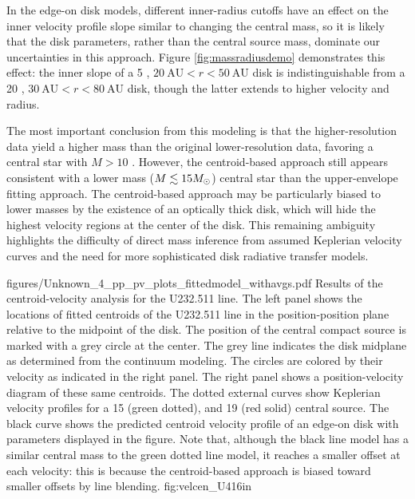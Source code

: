 \documentclass[twocolumn]{aastex61}
\begin{document}


In the edge-on disk models, different inner-radius cutoffs have an effect on
the inner velocity profile slope similar to changing the central mass, so it is
likely that the disk parameters, rather than the central source mass, dominate
our uncertainties in this approach.  
Figure \ref{fig:massradiusdemo} demonstrates this effect: the inner slope of
a 5 \msun, $20~\mathrm{AU} < r < 50~\mathrm{AU}$ disk is indistinguishable
from a 20 \msun , $30~\mathrm{AU} < r < 80~\mathrm{AU}$ disk, though the latter
extends to higher velocity and radius.

The most important conclusion from this modeling is that the higher-resolution
data yield a higher mass than the original lower-resolution data, favoring
a central star with $M>10$ \msun.  However, the centroid-based approach
still appears consistent with a lower mass ($M\lesssim15M_{\odot}$) central star
than the \citet{Seifried2016a} upper-envelope fitting approach.
The centroid-based approach may be particularly biased to lower masses
by the existence of an optically thick disk, which will hide the highest
velocity regions at the center of the disk.
This remaining
ambiguity highlights the difficulty of direct mass inference from assumed
Keplerian velocity curves and the need for more sophisticated disk radiative
transfer models.

\Figure
{figures/Unknown_4_pp_pv_plots_fittedmodel_withavgs.pdf}
{Results of the centroid-velocity analysis for the U232.511 line.
The left panel shows the locations of fitted centroids of the U232.511 line in
the position-position plane relative to the midpoint of the disk.  
The position of the central compact source is
marked with a grey circle at the center.  The grey line indicates the disk
midplane as determined from the continuum modeling.  The circles are colored by
their velocity as indicated in
the right panel.  The right panel shows a position-velocity diagram of these
same centroids.  The dotted external curves show Keplerian velocity profiles
for a 15 \msun (green dotted), and 19 \msun (red solid) central source.
The black
curve shows the predicted centroid velocity profile of an edge-on disk with
parameters displayed in the figure.
Note that, although the black line model has a similar central mass to the
green dotted line model, it reaches a smaller offset at each velocity: this is
because the centroid-based approach is biased toward smaller offsets by line
blending.
}
{fig:velcen_U4}{1}{6in}
\end{document}
